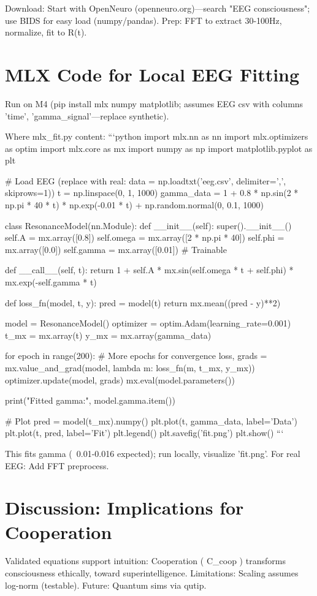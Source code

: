 \documentclass[12pt]{article}
\def\({}%
\def\){}%
\begin{document}
Download: Start with OpenNeuro (openneuro.org)—search "EEG consciousness"; use BIDS for easy load (numpy/pandas). Prep: FFT to extract 30-100Hz, normalize, fit to R(t).

\section{MLX Code for Local EEG Fitting}
Run on M4 (pip install mlx numpy matplotlib; assumes EEG csv with columns 'time', 'gamma_signal'—replace synthetic).


Where mlx_fit.py content:
```python
import mlx.nn as nn
import mlx.optimizers as optim
import mlx.core as mx
import numpy as np
import matplotlib.pyplot as plt

# Load EEG (replace with real: data = np.loadtxt('eeg.csv', delimiter=',', skiprows=1))
t = np.linspace(0, 1, 1000)
gamma_data = 1 + 0.8 * np.sin(2 * np.pi * 40 * t) * np.exp(-0.01 * t) + np.random.normal(0, 0.1, 1000)

class ResonanceModel(nn.Module):
    def __init__(self):
        super().__init__()
        self.A = mx.array([0.8])
        self.omega = mx.array([2 * np.pi * 40])
        self.phi = mx.array([0.0])
        self.gamma = mx.array([0.01])  # Trainable

    def __call__(self, t):
        return 1 + self.A * mx.sin(self.omega * t + self.phi) * mx.exp(-self.gamma * t)

def loss_fn(model, t, y):
    pred = model(t)
    return mx.mean((pred - y)**2)

model = ResonanceModel()
optimizer = optim.Adam(learning_rate=0.001)
t_mx = mx.array(t)
y_mx = mx.array(gamma_data)

for epoch in range(200):  # More epochs for convergence
    loss, grads = mx.value_and_grad(model, lambda m: loss_fn(m, t_mx, y_mx))
    optimizer.update(model, grads)
    mx.eval(model.parameters())

print("Fitted gamma:", model.gamma.item())

# Plot
pred = model(t_mx).numpy()
plt.plot(t, gamma_data, label='Data')
plt.plot(t, pred, label='Fit')
plt.legend()
plt.savefig('fit.png')
plt.show()
```

This fits gamma (~0.01-0.016 expected); run locally, visualize 'fit.png'. For real EEG: Add FFT preprocess.

\section{Discussion: Implications for Cooperation}
Validated equations support intuition: Cooperation (\( C_{coop} \)) transforms consciousness ethically, toward superintelligence. Limitations: Scaling assumes log-norm (testable). Future: Quantum sims via qutip.
\end{document}
